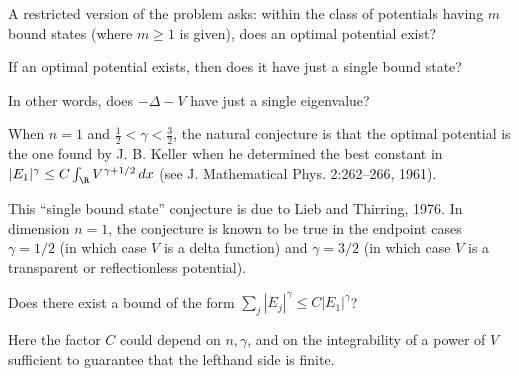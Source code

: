 \documentclass[12pt,letterpaper, reqno]{amsart}
\begin{document}
\begin{problemblock}
\begin{problem}[2.13]
A restricted version of the problem asks: within the class of
potentials having $m$ bound states (where $m \geq 1$ is given), does
an optimal potential exist?
\end{problem}
\end{problemblock}




\begin{problemblock}

\begin{problem}[2.16] 
If an optimal potential exists, then does it have just a single bound state?
\end{problem}

\begin{distinguishedremark}
In other
words, does $-\Delta - V$ have just a single eigenvalue?
\end{distinguishedremark}


\begin{remark}
When $n=1$
and $\frac{1}{2} < \gamma < \frac{3}{2}$, the natural conjecture is
that the optimal potential is the one found by J. B. Keller when he
determined the best constant in $|E_1|^\gamma \leq C \int_\R
V^{\gamma + 1/2} \, dx$ (see J. Mathematical Phys. 2:262--266,
1961).
\end{remark}

\begin{remark}
This ``single bound state'' conjecture is due to Lieb and Thirring,
1976. In dimension $n=1$, the conjecture is known to be true in the
endpoint cases $\gamma=1/2$ (in which case $V$ is a delta function)
and $\gamma=3/2$ (in which case $V$ is a transparent or
reflectionless potential).
\end{remark}

\end{problemblock}

\begin{problemblock}

\begin{problem}[2.2]  
Does there exist a bound of the
form $\sum_j |E_j|^\gamma \leq C |E_1|^\gamma$? 
\end{problem}

\begin{distinguishedremark}
 Here the factor $C$
could depend on $n,\gamma$, and on the integrability of a power of
$V$ sufficient to guarantee that the lefthand side is finite.
\end{distinguishedremark}

\end{problemblock}
\end{document}
